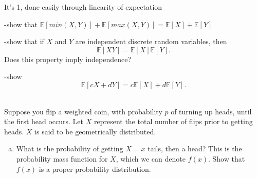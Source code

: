 \documentclass[]{article}
\newif\ifsolutions
\renewcommand{\answer}[1]{{\color{mydarkblue}\textbf{Solution:}#1}}
\begin{document}
\begin{qunlist}



It's 1, done easily through linearity of expectation



 
-show that $\mathbb{E}[min(X,Y)] + \mathbb{E}[max(X,Y)] = \mathbb{E}[X] + \mathbb{E}[Y]$

-show that if $X$ and $Y$ are independent discrete random variables, then \[\mathbb{E}[XY] = \mathbb{E}[X] \mathbb{E}[Y].\]  Does this property imply independence?

-show
\[\mathbb{E}[cX + dY] = c\mathbb{E}[X] + d \mathbb{E}[Y].\]


 \\ Suppose you flip a weighted coin, with probability $p$ of turning up heads, until the first head occurs. Let $X$ represent the total number of flips prior to getting heads. $X$ is said to be geometrically distributed.

\begin{enumerate}[a)]

\qpart
\item What is the probability of getting $X=x$ tails, then a head?  This is the probability mass function for $X$, which we can denote $f(x)$.  Show that $f(x)$ is a proper probability distribution.

\ifsolutions{ \answer{ The probability of getting $x$ tails is $(1-p)^x$. Therefore the probability of getting $x$ tails, then getting a head is
	\[ f(x) = (1-p)^x p. \]
	To show this is a valid probability distribution, we need to make sure the sum of $f(x)$ over all possible $x$ is 1. Using the formula for an infinite geometric series,
	\[ \sum_{x=0}^{\infty} f(x) = p \sum_{x=0}^{\infty} (1-p)^x = p \cdot \frac{1}{1-(1-p)} = 1. \]
}}\fi


\end{enumerate}
\end{qunlist}
\end{document}

